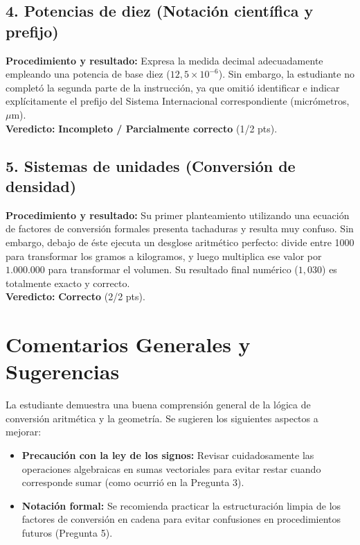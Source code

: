 \documentclass[12pt]{article}
\begin{document}
\subsection*{4. Potencias de diez (Notación científica y prefijo)}
\textbf{Procedimiento y resultado:} Expresa la medida decimal adecuadamente empleando una potencia de base diez ($12,5 \times 10^{-6}$). Sin embargo, la estudiante no completó la segunda parte de la instrucción, ya que omitió identificar e indicar explícitamente el prefijo del Sistema Internacional correspondiente (micrómetros, $\mu$m). \\
\textbf{Veredicto:} \textbf{Incompleto / Parcialmente correcto} (1/2 pts).

\subsection*{5. Sistemas de unidades (Conversión de densidad)}
\textbf{Procedimiento y resultado:} Su primer planteamiento utilizando una ecuación de factores de conversión formales presenta tachaduras y resulta muy confuso. Sin embargo, debajo de éste ejecuta un desglose aritmético perfecto: divide entre 1000 para transformar los gramos a kilogramos, y luego multiplica ese valor por $1.000.000$ para transformar el volumen. Su resultado final numérico ($1,030$) es totalmente exacto y correcto. \\
\textbf{Veredicto:} \textbf{Correcto} (2/2 pts).

\vspace{0.5cm}
\section*{Comentarios Generales y Sugerencias}
La estudiante demuestra una buena comprensión general de la lógica de conversión aritmética y la geometría. Se sugieren los siguientes aspectos a mejorar:
\begin{itemize}
    \item \textbf{Precaución con la ley de los signos:} Revisar cuidadosamente las operaciones algebraicas en sumas vectoriales para evitar restar cuando corresponde sumar (como ocurrió en la Pregunta 3).
    \item \textbf{Notación formal:} Se recomienda practicar la estructuración limpia de los factores de conversión en cadena para evitar confusiones en procedimientos futuros (Pregunta 5).
\end{itemize}
\end{document}
